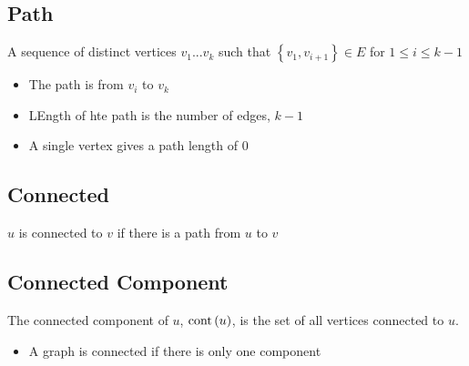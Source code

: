   \subsection{Path}

    A sequence of distinct vertices $ v_{1} ... v_{k} $ such that
    $ \left\{ v_{1}, v_{i + 1} \right\} \in E $ for $ 1 \le i \le k - 1 $

    \begin{itemize}
      \item The path is from $ v_{i} $ to $ v_{k} $
      \item LEngth of hte path is the number of edges, $ k - 1 $
      \item A single vertex gives a path length of $ 0 $
    \end{itemize}

  \subsection{Connected}

    $ u $ is connected to $ v $ if there is a path from $ u $ to $ v $

  \subsection{Connected Component}

    The connected component of $ u $, $ \operatorname{cont}\left( u \right) $, is the
    set of all vertices connected to $ u $.

    \begin{itemize}
      \item A graph is connected if there is only one component
    \end{itemize}
